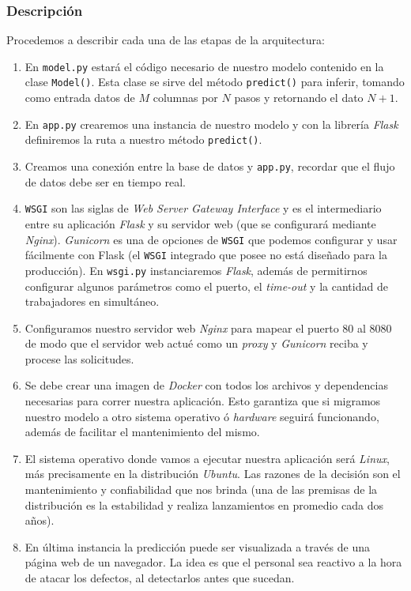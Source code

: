 \documentclass[a4paper,12pt]{article}
\begin{document}
		\subsubsection{Descripción}
		Procedemos a describir cada una de las etapas de la arquitectura:
		\begin{enumerate}[noitemsep, topsep=2pt]
			\item En \texttt{model.py} estará el código necesario de nuestro modelo contenido en la clase \texttt{Model()}. Esta clase se sirve del método \texttt{predict()} para inferir, tomando como entrada datos de $M$ columnas por $N$ pasos y retornando el dato $N+1$.
			\item En \texttt{app.py} crearemos una instancia de nuestro modelo y con la librería \textit{Flask} definiremos la ruta a nuestro método \texttt{predict()}.
			\item Creamos una conexión entre la base de datos y \texttt{app.py}, recordar que el flujo de datos debe ser en tiempo real.
			\item \texttt{WSGI} son las siglas de \textit{Web Server Gateway Interface} y es el intermediario entre su aplicación \textit{Flask} y su servidor web (que se configurará mediante \textit{Nginx}). \textit{Gunicorn} es una de opciones de \texttt{WSGI} que podemos configurar y usar fácilmente con Flask (el \texttt{WSGI} integrado que posee no está diseñado para la producción). En \texttt{wsgi.py} instanciaremos \textit{Flask}, además de permitirnos configurar algunos parámetros como el puerto, el \textit{time-out} y la cantidad de trabajadores en simultáneo.
			\item Configuramos nuestro servidor web \textit{Nginx} para mapear el puerto 80 al 8080 de modo que el servidor web actué como un \textit{proxy} y \textit{Gunicorn} reciba y procese las solicitudes.
			\item Se debe crear una imagen de \textit{Docker} con todos los archivos y dependencias necesarias para correr nuestra aplicación. Esto garantiza que si migramos nuestro modelo a otro sistema operativo ó \textit{hardware} seguirá funcionando, además de facilitar el mantenimiento del mismo.
			\item El sistema operativo donde vamos a ejecutar nuestra aplicación será \textit{Linux}, más precisamente en la distribución \textit{Ubuntu}. Las razones de la decisión son el mantenimiento y confiabilidad que nos brinda (una de las premisas de la distribución es la estabilidad y realiza lanzamientos en promedio cada dos años).
			\item En última instancia la predicción puede ser visualizada a través de una página web de un navegador. La idea es que el personal sea reactivo a la hora de atacar los defectos, al detectarlos antes que sucedan.
		\end{enumerate}
				
\end{document}
